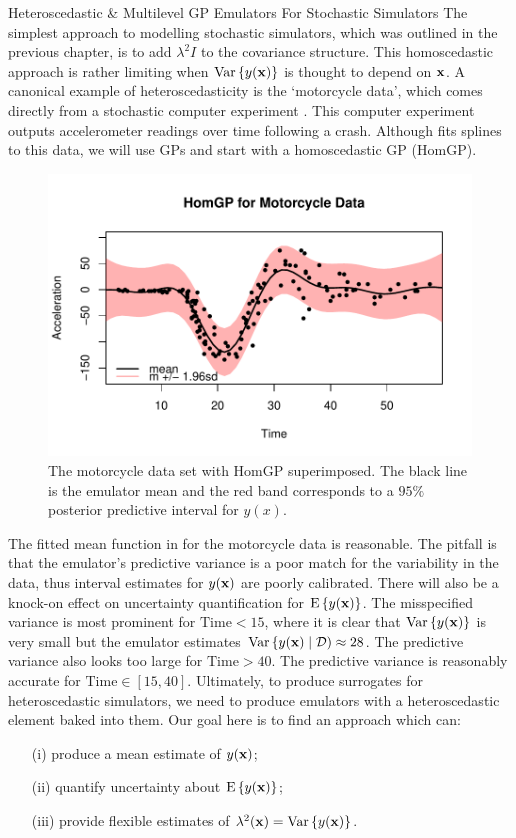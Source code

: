 \begin{chapter}{Heteroscedastic \& Multilevel GP Emulators For Stochastic Simulators\label{Ch:Hetsml}}
The simplest approach to modelling stochastic simulators, which was outlined in the previous chapter, is to add $\lambda^2 I$ to the covariance structure. This homoscedastic approach is rather limiting when $\mathrm{Var}\,\{ y(\mathbf{x}) \}$ is thought to depend on $\mathbf{x}$. A canonical example of heteroscedasticity is the `motorcycle data', which comes directly from a stochastic computer experiment \citep{Schmidt1981}. This computer experiment outputs accelerometer readings over time following a crash. Although \citet{Silverman1985} fits splines to this data, we will use GPs and start with a homoscedastic GP (HomGP).
\begin{figure}[ht]
	\includegraphics{fig-het-sml/mcycle-homgp.pdf}
	\caption{The motorcycle data set with HomGP superimposed. The black line is the emulator mean and the red band corresponds to a $95\%$ posterior predictive interval for $y(x)$.}
	\label{Fig:mcycle-hom}
\end{figure}

The fitted mean function in  for the motorcycle data is reasonable. The pitfall is that the emulator's predictive variance is a poor match for the variability in the data, thus interval estimates for $y(\mathbf{x})$ are poorly calibrated. There will also be a knock-on effect on uncertainty quantification for $\textrm{E}\, \{ y(\mathbf{x}) \}$. The misspecified variance is most prominent for $\text{Time}<15$, where it is clear that $\mathrm{Var}\, \{y(\mathbf{x}) \}$ is very small but the emulator estimates $\mathrm{Var}\,\{ y(\mathbf{x}) \mid \mathcal{D}) \approx 28$. The predictive variance also looks too large for $\text{Time}>40$. The predictive variance is reasonably accurate for $\text{Time} \in [15, 40]$. Ultimately, to produce surrogates for heteroscedastic simulators, we need to produce emulators with a heteroscedastic element baked into them. Our goal here is to find an approach which can:
\begin{itemize}
	\item[(i)] produce a mean estimate of $y(\mathbf{x})$;
	\item[(ii)] quantify uncertainty about $\textrm{E}\, \{ y(\mathbf{x}) \} $;
	\item[(iii)] provide flexible estimates of $\lambda^2(\mathbf{x}) = \mathrm{Var}\,\{ y(\mathbf{x}) \}$.
\end{itemize}

\end{chapter}

